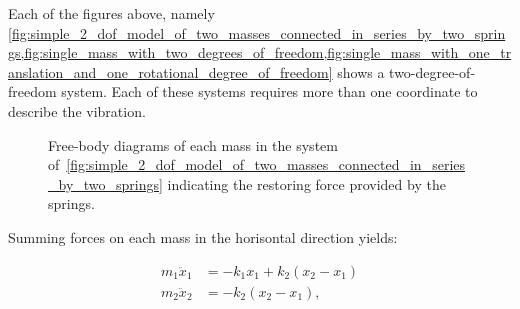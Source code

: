   Each of the figures above, namely \cref{fig:simple_2_dof_model_of_two_masses_connected_in_series_by_two_springs,fig:single_mass_with_two_degrees_of_freedom,fig:single_mass_with_one_translation_and_one_rotational_degree_of_freedom} shows a two-degree-of-freedom system. Each of these systems requires more than one coordinate to describe the vibration.

  \begin{figure}[h!]
    \centering
    \caption{Free-body diagrams of each mass in the system of~\cref{fig:simple_2_dof_model_of_two_masses_connected_in_series_by_two_springs} indicating the restoring force provided by the springs.}\label{fig:fbd_of_two_sprint_mass_system}
  \end{figure}

  Summing forces on each mass in the horisontal direction yields:

  \begin{equation}
    \begin{aligned}
      m_{1}\ddot{x}_{1} &= -k_{1}x_{1} + k_{2}(x_{2} - x_{1}) \\
      m_{2}\ddot{x}_{2} &= -k_{2}(x_{2} - x_{1}),
    \end{aligned}
  \end{equation}

